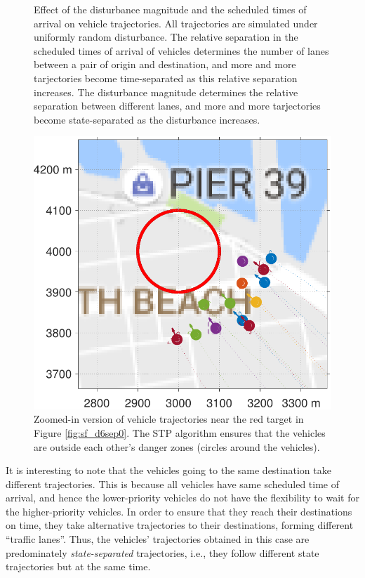 \begin{figure}
\begin{subfigure}{0.5\textwidth}
    \label{fig:sf_d11sep5}
  \end{subfigure}
  \caption{Effect of the disturbance magnitude and the scheduled times of arrival on vehicle trajectories. All trajectories are simulated under uniformly random disturbance. The relative separation in the scheduled times of arrival of vehicles determines the number of lanes between a pair of origin and destination, and more and more tarjectories become time-separated as this relative separation increases. The disturbance magnitude determines the relative separation between different lanes, and more and more tarjectories become state-separated as the disturbance increases. }
  \label{fig:trajectories_sf}
\end{figure}

\begin{figure}[h]
  \centering
  \includegraphics[width=\columnwidth]{figs/sf_d6sep0_zoomed}
  \caption{Zoomed-in version of vehicle trajectories near the red target in Figure \ref{fig:sf_d6sep0}. The STP algorithm ensures that the vehicles are outside each other's danger zones (circles around the vehicles).} 
  \label{fig:sf_d6sep0_zoomed}
\end{figure}
It is interesting to note that the vehicles going to the same destination take different trajectories. This is because all vehicles have same scheduled time of arrival, and hence the lower-priority vehicles do not have the flexibility to wait for the higher-priority vehicles. In order to ensure that they reach their destinations on time, they take alternative trajectories to their destinations, forming different ``traffic lanes''. Thus, the vehicles' trajectories obtained in this case are predominately \textit{state-separated} trajectories, i.e., they follow different state trajectories but at the same time. 

